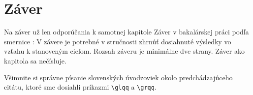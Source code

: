 \chapter*{Záver}

Na záver už len odporúčania k samotnej kapitole Záver v bakalárskej
práci podľa smernice \cite{smernica}:  \glqq{}V závere je potrebné v
stručnosti zhrnúť dosiahnuté výsledky vo vzťahu k stanoveným
cieľom. Rozsah záveru je minimálne dve strany. Záver ako kapitola sa
nečísluje.\grqq{}

Všimnite si správne písanie slovenských úvodzoviek okolo
predchádzajúceho citátu, ktoré sme dosiahli príkazmi \verb'\glqq' a
\verb'\grqq'.

